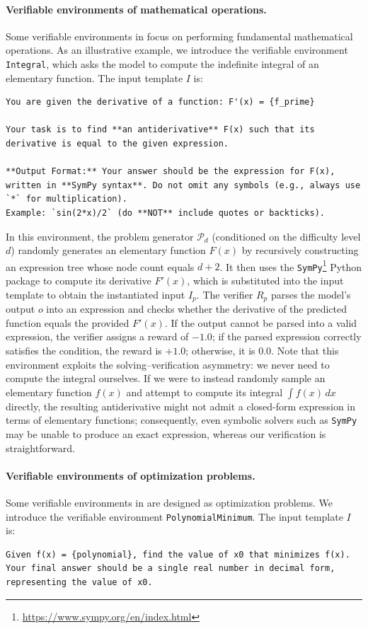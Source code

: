 \documentclass{article}
\theoremstyle{plain}
\theoremstyle{definition}
\theoremstyle{remark}
\begin{document}
\paragraph{Verifiable environments of mathematical operations.}
Some verifiable environments in \suite{} focus on performing fundamental mathematical operations.
As an illustrative example, we introduce the verifiable environment \texttt{Integral}, which asks the model to compute the indefinite integral of an elementary function.
The input template $I$ is:
\begin{lstlisting}[language={},caption={},label={}]
You are given the derivative of a function: F'(x) = {f_prime}

Your task is to find **an antiderivative** F(x) such that its derivative is equal to the given expression.

**Output Format:** Your answer should be the expression for F(x), written in **SymPy syntax**. Do not omit any symbols (e.g., always use `*` for multiplication).
Example: `sin(2*x)/2` (do **NOT** include quotes or backticks).
\end{lstlisting}
In this environment, the problem generator $\mathcal{P}_{d}$ (conditioned on the difficulty level $d$) randomly generates an elementary function $F(x)$ by recursively constructing an expression tree whose node count equals $d+2$.
It then uses the \texttt{SymPy}\footnote{\url{https://www.sympy.org/en/index.html}} Python package to compute its derivative $F'(x)$, which is substituted into the input template to obtain the instantiated input $I_{p}$.
The verifier $R_{p}$ parses the model’s output $o$ into an expression and checks whether the derivative of the predicted function equals the provided $F'(x)$.
If the output cannot be parsed into a valid expression, the verifier assigns a reward of $-1.0$;
if the parsed expression correctly satisfies the condition, the reward is $+1.0$; otherwise, it is $0.0$.
Note that this environment exploits the solving–verification asymmetry: we never need to compute the integral ourselves.
If we were to instead randomly sample an elementary function $f(x)$ and attempt to compute its integral $\int f(x)\,dx$ directly, the resulting antiderivative might not admit a closed-form expression in terms of elementary functions;
consequently, even symbolic solvers such as \texttt{SymPy} may be unable to produce an exact expression, whereas our verification is straightforward.

\paragraph{Verifiable environments of optimization problems.}
Some verifiable environments in \suite{} are designed as optimization problems. 
We introduce the verifiable environment \texttt{PolynomialMinimum}.
The input template $I$ is:
\begin{lstlisting}[language={},caption={},label={}]
Given f(x) = {polynomial}, find the value of x0 that minimizes f(x).
Your final answer should be a single real number in decimal form, representing the value of x0.
\end{lstlisting}
\end{document}

